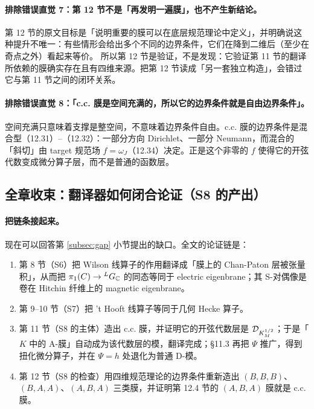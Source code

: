 \paragraph{排除错误直觉 7：第 12 节不是「再发明一遍膜」，也不产生新结论。}第 12 节的原文目标是「说明重要的膜可以在底层规范理论中定义」，并明确说这种提升不唯一：有些情形会给出多个不同的边界条件，它们在降到二维后（至少在奇点之外）看起来等价。\pA{} 所以第 12 节是验证，不是发现：它验证第 11 节的翻译所依赖的膜确实存在且有四维来源。把第 12 节读成「另一套独立构造」，会错过它与第 11 节之间的闭环关系。

\paragraph{排除错误直觉 8：「c.c. 膜是空间充满的，所以它的边界条件就是自由边界条件」。}空间充满只意味着支撑是整空间，不意味着边界条件自由。c.c. 膜的边界条件是混合型（12.31）--（12.32）：一部分方向 Dirichlet、一部分 Neumann，而混合的「斜切」由 target 规范场 \(f=\omega_J\)（12.34）决定。正是这个非零的 \(f\) 使得它的开弦代数变成微分算子层，而不是普通的函数层。\pA{}

\subsection{全章收束：翻译器如何闭合论证（S8 的产出）}
\label{subsec:close}

\paragraph{把链条接起来。}现在可以回答第 \ref{subsec:gap} 小节提出的缺口。全文的论证链是：

\begin{enumerate}
\item 第 8 节（S6）把 Wilson 线算子的作用翻译成「膜上的 Chan-Paton 层被张量积」，从而把 \(\pi_1(C)\to{}^{L}G_{\mathbb{C}}\) 的同态等同于 electric eigenbrane；其 S-对偶像是卷在 Hitchin 纤维上的 magnetic eigenbrane。\pA{}
\item 第 9--10 节（S7）把 't Hooft 线算子等同于几何 Hecke 算子。\pA{}
\item 第 11 节（S8 的主体）造出 c.c. 膜，并证明它的开弦代数层是 \(\mathcal{D}_{K_M^{1/2}}\)；于是「\(K\) 中的 A-膜」自动成为该代数层的模，翻译完成；\S11.3 再把 \(\Psi\) 推广，得到扭化微分算子，并在 \(\Psi=h\) 处退化为普通 D-模。\pA{}\pA{}
\item 第 12 节（S8 的检查）用四维规范理论的边界条件重新造出 \((B,B,B)\)、\((B,A,A)\)、\((A,B,A)\) 三类膜，并证明第 12.4 节的 \((A,B,A)\) 膜就是 c.c. 膜。\pA{}\pA{}
\end{enumerate}

